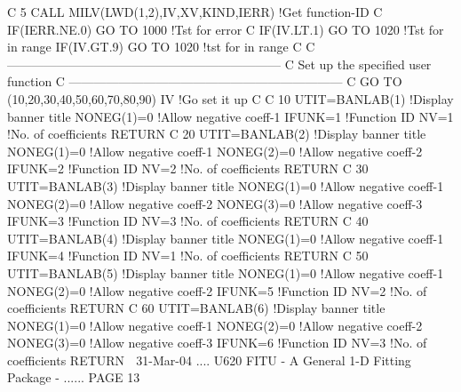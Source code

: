    C
       5 CALL MILV(LWD(1,2),IV,XV,KIND,IERR)     !Get function-ID
   C
         IF(IERR.NE.0) GO TO 1000                !Tst for error
   C
         IF(IV.LT.1)   GO TO 1020                !Tst for in range
         IF(IV.GT.9)   GO TO 1020                !tst for in range
   C
   C     ------------------------------------------------------------------
   C     Set up the specified user function
   C     ------------------------------------------------------------------
   C
         GO TO (10,20,30,40,50,60,70,80,90) IV   !Go set it up
   C
   C
      10 UTIT=BANLAB(1)                          !Display banner title
         NONEG(1)=0                              !Allow negative coeff-1
         IFUNK=1                                 !Function ID
         NV=1                                    !No. of coefficients
         RETURN
   C
      20 UTIT=BANLAB(2)                          !Display banner title
         NONEG(1)=0                              !Allow negative coeff-1
         NONEG(2)=0                              !Allow negative coeff-2
         IFUNK=2                                 !Function ID
         NV=2                                    !No. of coefficients
         RETURN
   C
      30 UTIT=BANLAB(3)                          !Display banner title
         NONEG(1)=0                              !Allow negative coeff-1
         NONEG(2)=0                              !Allow negative coeff-2
         NONEG(3)=0                              !Allow negative coeff-3
         IFUNK=3                                 !Function ID
         NV=3                                    !No. of coefficients
         RETURN
   C
      40 UTIT=BANLAB(4)                          !Display banner title
         NONEG(1)=0                              !Allow negative coeff-1
         IFUNK=4                                 !Function ID
         NV=1                                    !No. of coefficients
         RETURN
   C
      50 UTIT=BANLAB(5)                          !Display banner title
         NONEG(1)=0                              !Allow negative coeff-1
         NONEG(2)=0                              !Allow negative coeff-2
         IFUNK=5                                 !Function ID
         NV=2                                    !No. of coefficients
         RETURN
   C
      60 UTIT=BANLAB(6)                          !Display banner title
         NONEG(1)=0                              !Allow negative coeff-1
         NONEG(2)=0                              !Allow negative coeff-2
         NONEG(3)=0                              !Allow negative coeff-3
         IFUNK=6                                 !Function ID
         NV=3                                    !No. of coefficients
         RETURN
    
   31-Mar-04 .... U620  FITU - A General 1-D Fitting Package - ...... PAGE  13
 
